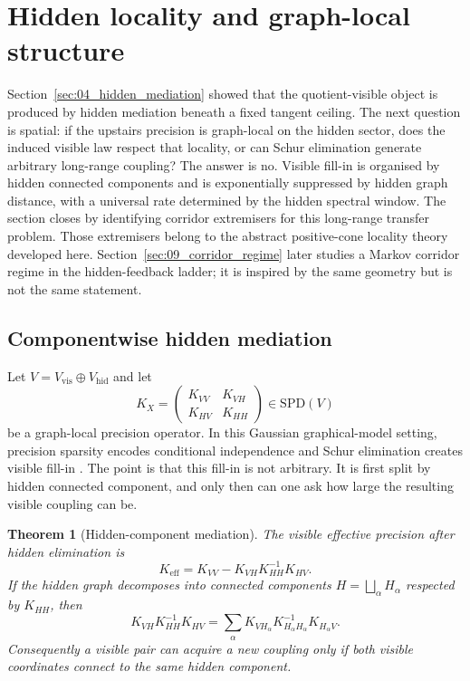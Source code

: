 \documentclass[11pt]{article}
\numberwithin{equation}{section}
\newcommand{\SPD}{\mathrm{SPD}}
\theoremstyle{thmcompact}
\newtheorem{theorem}{Theorem}[section]
\theoremstyle{remark}
\begin{document}
\section{Hidden locality and graph-local structure}
\label{sec:05_hidden_locality}

Section~\ref{sec:04_hidden_mediation} showed that the quotient-visible object is produced by hidden mediation beneath a fixed tangent ceiling. The next question is spatial: if the upstairs precision is graph-local on the hidden sector, does the induced visible law respect that locality, or can Schur elimination generate arbitrary long-range coupling? The answer is no. Visible fill-in is organised by hidden connected components and is exponentially suppressed by hidden graph distance, with a universal rate determined by the hidden spectral window. The section closes by identifying corridor extremisers for this long-range transfer problem. Those extremisers belong to the abstract positive-cone locality theory developed here. Section~\ref{sec:09_corridor_regime} later studies a Markov corridor regime in the hidden-feedback ladder; it is inspired by the same geometry but is not the same statement.

\subsection{Componentwise hidden mediation}
\label{subsec:componentwise-hidden-mediation}

Let $V=V_{\mathrm{vis}}\oplus V_{\mathrm{hid}}$ and let
\begin{equation}\label{eq:local-block}
K_X=
\begin{pmatrix}
K_{VV} & K_{VH}\\
K_{HV} & K_{HH}
\end{pmatrix}
\in\SPD(V)
\end{equation}
be a graph-local precision operator. In this Gaussian graphical-model setting, precision sparsity encodes conditional independence and Schur elimination creates visible fill-in \cite{Dempster1972,Lauritzen1996,GeorgeLiu1981}. The point is that this fill-in is not arbitrary. It is first split by hidden connected component, and only then can one ask how large the resulting visible coupling can be.

\begin{theorem}[Hidden-component mediation]\label{thm:hidden-components}
The visible effective precision after hidden elimination is
\begin{equation}\label{eq:keff}
K_{\mathrm{eff}}=K_{VV}-K_{VH}K_{HH}^{-1}K_{HV}.
\end{equation}
If the hidden graph decomposes into connected components $H=\bigsqcup_{\alpha} H_\alpha$ respected by $K_{HH}$, then
\begin{equation}\label{eq:component-sum}
K_{VH}K_{HH}^{-1}K_{HV}
=
\sum_{\alpha} K_{V H_\alpha}K_{H_\alpha H_\alpha}^{-1}K_{H_\alpha V}.
\end{equation}
Consequently a visible pair can acquire a new coupling only if both visible coordinates connect to the same hidden component.
\end{theorem}
\end{document}
